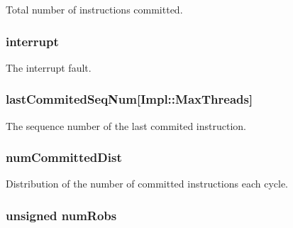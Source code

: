 \label{classDefaultCommit_a23714085cc19270c017a67c9a508601a}
Total number of instructions committed. \hypertarget{classDefaultCommit_a7387b2358d0f884ccd5c383e6199f035}{
\subsubsection[{interrupt}]{ {\bf interrupt}}}
\label{classDefaultCommit_a7387b2358d0f884ccd5c383e6199f035}
The interrupt fault. \hypertarget{classDefaultCommit_a4feaee1ef312dda13cff064de20dfbf3}{
\subsubsection[{lastCommitedSeqNum}]{ {\bf lastCommitedSeqNum}\mbox{[}Impl::MaxThreads\mbox{]}}}
\label{classDefaultCommit_a4feaee1ef312dda13cff064de20dfbf3}
The sequence number of the last commited instruction. \hypertarget{classDefaultCommit_ab1b6b40d7860fef5059f9bf1b843b366}{
\subsubsection[{numCommittedDist}]{ {\bf numCommittedDist}}}
\label{classDefaultCommit_ab1b6b40d7860fef5059f9bf1b843b366}
Distribution of the number of committed instructions each cycle. \hypertarget{classDefaultCommit_a35ee8ef405428b8d8595176ea6581681}{
\subsubsection[{numRobs}]{\setlength{\rightskip}{0pt plus 5cm}unsigned {\bf numRobs}}}
